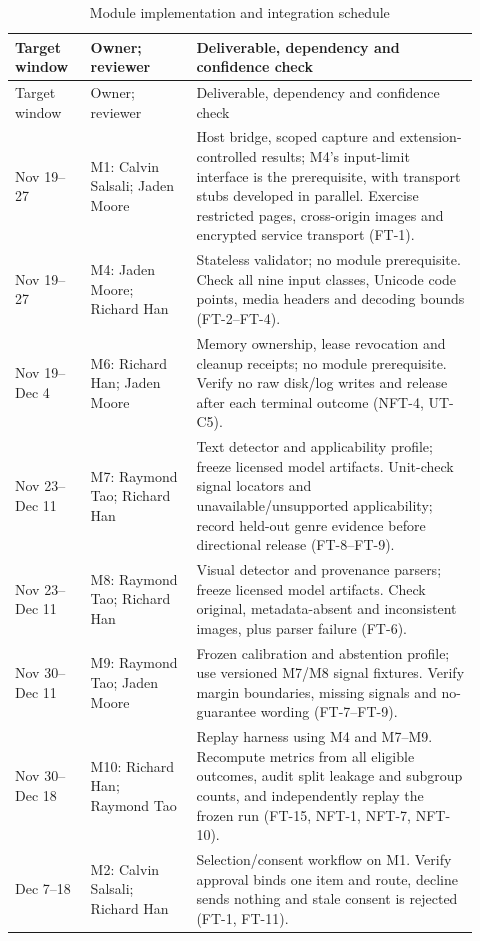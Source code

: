 \documentclass[12pt, titlepage]{article}
\begin{document}
\begin{longtable}{@{}p{0.15\linewidth}p{0.21\linewidth}p{0.56\linewidth}@{}}
\caption{Module implementation and integration schedule}\label{TblSchedule}\\
\toprule Target window & Owner; reviewer & Deliverable, dependency and confidence check \\ \midrule
\endfirsthead
\toprule Target window & Owner; reviewer & Deliverable, dependency and confidence check \\ \midrule
\endhead
Nov 19--27 & M1: Calvin Salsali; Jaden Moore & Host bridge, scoped capture and extension-controlled results; M4's input-limit interface is the prerequisite, with transport stubs developed in parallel. Exercise restricted pages, cross-origin images and encrypted service transport (FT-1). \\
Nov 19--27 & M4: Jaden Moore; Richard Han & Stateless validator; no module prerequisite. Check all nine input classes, Unicode code points, media headers and decoding bounds (FT-2--FT-4). \\
Nov 19--Dec 4 & M6: Richard Han; Jaden Moore & Memory ownership, lease revocation and cleanup receipts; no module prerequisite. Verify no raw disk/log writes and release after each terminal outcome (NFT-4, UT-C5). \\
Nov 23--Dec 11 & M7: Raymond Tao; Richard Han & Text detector and applicability profile; freeze licensed model artifacts. Unit-check signal locators and unavailable/unsupported applicability; record held-out genre evidence before directional release (FT-8--FT-9). \\
Nov 23--Dec 11 & M8: Raymond Tao; Richard Han & Visual detector and provenance parsers; freeze licensed model artifacts. Check original, metadata-absent and inconsistent images, plus parser failure (FT-6). \\
Nov 30--Dec 11 & M9: Raymond Tao; Jaden Moore & Frozen calibration and abstention profile; use versioned M7/M8 signal fixtures. Verify margin boundaries, missing signals and no-guarantee wording (FT-7--FT-9). \\
Nov 30--Dec 18 & M10: Richard Han; Raymond Tao & Replay harness using M4 and M7--M9. Recompute metrics from all eligible outcomes, audit split leakage and subgroup counts, and independently replay the frozen run (FT-15, NFT-1, NFT-7, NFT-10). \\
Dec 7--18 & M2: Calvin Salsali; Richard Han & Selection/consent workflow on M1. Verify approval binds one item and route, decline sends nothing and stale consent is rejected (FT-1, FT-11). \\

\end{longtable}
\end{document}
